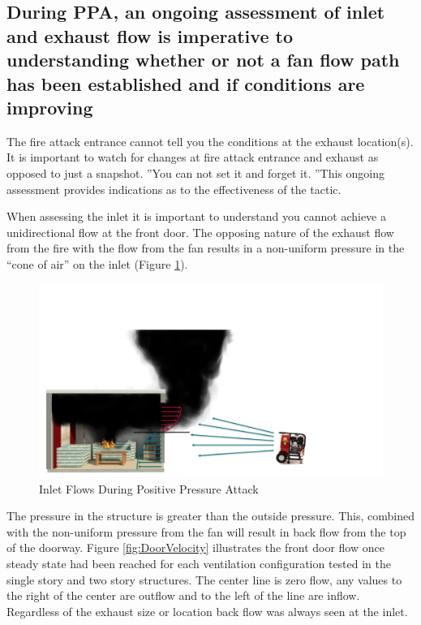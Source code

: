\documentclass{article}
\begin{document}
\subsection{During PPA, an ongoing assessment of inlet and exhaust flow is imperative to understanding whether or not a fan flow path has been established and if conditions are improving} \label{sec:OngoingAssessment}
The fire attack entrance cannot tell you the conditions at the exhaust location(s). It is important to watch for changes at fire attack entrance and exhaust as opposed to just a snapshot. ''You can not set it and forget it. ''This ongoing assessment provides indications as to the effectiveness of the tactic. 

When assessing the inlet it is important to understand you cannot achieve a unidirectional flow at the front door. The opposing nature of the exhaust flow from the fire with the flow from the fan results in a non-uniform pressure in the “cone of air” on the inlet (Figure \ref{fig:FanAndDoorFlow}).

\begin{figure}[H]
	\centering
	\includegraphics[width = 6in]{0_Images/Tactical_Considerations/Ongoing_Assessment/FanandDoorFlow.pdf}
	\caption{Inlet Flows During Positive Pressure Attack}
	\label{fig:FanAndDoorFlow}
\end{figure}

The pressure in the structure is greater than the outside pressure. This, combined with the non-uniform pressure from the fan will result in back flow from the top of the doorway. Figure \ref{fig:DoorVelocity} illustrates the front door flow once steady state had been reached for each ventilation configuration tested in the single story and two story structures. The center line is zero flow, any values to the right of the center are outflow and to the left of the line are inflow. Regardless of the exhaust size or location back flow was always seen at the inlet.
\end{document}
